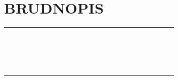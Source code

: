 \documentclass[10pt]{article}
\begin{document}
\section*{BRUDNOPIS}
\begin{center}
\begin{tabular}{|c|c|c|c|c|c|c|c|c|c|c|c|c|c|c|c|c|c|c|c|c|c|c|c|}
\hline
 &  &  &  &  &  &  &  &  &  &  &  &  &  &  &  &  &  &  &  &  &  &  &  \\
\hline
 &  &  &  &  &  &  &  &  &  &  &  &  &  &  &  &  &  &  &  &  &  &  &  \\
\hline
 &  &  &  &  &  &  &  &  &  &  &  &  &  &  &  &  &  &  &  &  &  &  &  \\
\hline
 &  &  &  &  &  &  &  &  &  &  &  &  &  &  &  &  &  &  &  &  &  &  &  \\
\hline
 &  &  &  &  &  &  &  &  &  &  &  &  &  &  &  &  &  &  &  &  &  &  &  \\
\hline
 &  &  &  &  &  &  &  &  &  &  &  &  &  &  &  &  &  &  &  &  &  &  &  \\
\hline
 &  &  &  &  &  &  &  &  &  &  &  &  &  &  &  &  &  &  &  &  &  &  &  \\
\hline
 &  &  &  &  &  &  &  &  &  &  &  &  &  &  &  &  &  &  &  &  &  &  &  \\
\hline
 &  &  &  &  &  &  &  &  &  &  &  &  &  &  &  &  &  &  &  &  &  &  &  \\
\hline
 &  &  &  &  &  &  &  &  &  &  &  &  &  &  &  &  &  &  &  &  &  &  &  \\
\hline
 &  &  &  &  &  &  &  &  &  &  &  &  &  &  &  &  &  &  &  &  &  &  &  \\
\hline
 &  &  &  &  &  &  &  &  &  &  &  &  &  &  &  &  &  &  &  &  &  &  &  \\
\hline
 &  &  &  &  &  &  &  &  &  &  &  &  &  &  &  &  &  &  &  &  &  &  &  \\
\hline
 &  &  &  &  &  &  &  &  &  &  &  &  &  &  &  &  &  &  &  &  &  &  &  \\
\hline
 &  &  &  &  &  &  &  &  &  &  &  &  &  &  &  &  &  &  &  &  &  &  &  \\
\hline
 &  &  &  &  &  &  &  &  &  &  &  &  &  &  &  &  &  &  &  &  &  &  &  \\
\hline
 &  &  &  &  &  &  &  &  &  &  &  &  &  &  &  &  &  &  &  &  &  &  &  \\
\hline
 &  &  &  &  &  &  &  &  &  &  &  &  &  &  &  &  &  &  &  &  &  &  &  \\
\hline
 &  &  &  &  &  &  &  &  &  &  &  &  &  &  &  &  &  &  &  &  &  &  &  \\

\end{tabular}
\end{center}
\end{document}
